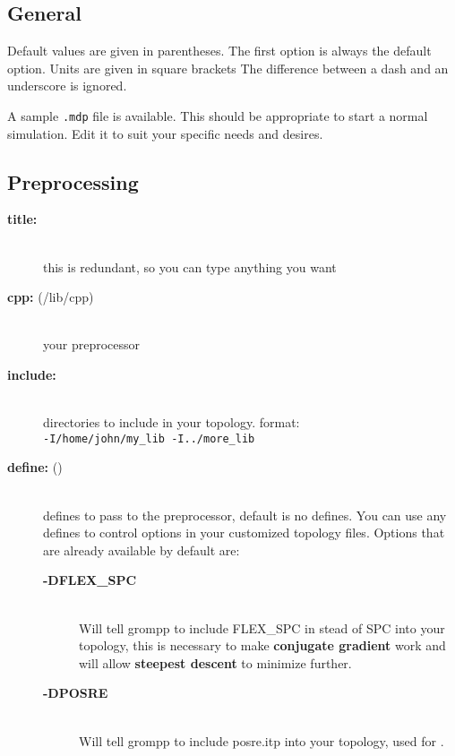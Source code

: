 \subsection{General}

Default values are given in parentheses. The first option is
always the default option. Units are given in square brackets The
difference between a dash and an underscore is ignored. 

A sample {\tt .mdp} file is
available. This should be appropriate to start a normal
simulation. Edit it to suit your specific needs and desires. 

\subsection{Preprocessing}
\begin{description}
\item[{\bf title:}]\mbox{}\\
this is redundant, so you can type anything you want
\item[{\bf cpp: }(/lib/cpp)]\mbox{}\\
your preprocessor
\item[{\bf include:}]\mbox{}\\
directories to include in your topology. format: 
\\{\tt-I/home/john/my\_lib -I../more\_lib}\\
\item[{\bf define: }()]\mbox{}\\
defines to pass to the preprocessor, default is no defines. You can use
any defines to control options in your customized topology files. Options
that are already available by default are:
\vspace{-2ex}\begin{description}
\item[{\bf -DFLEX\_SPC}]\mbox{}\\
Will tell grompp to include FLEX\_SPC in stead of SPC into your
topology, this is necessary to make 
{\bf conjugate gradient} work and will allow 
{\bf steepest descent} to minimize further.
\item[{\bf -DPOSRE}]\mbox{}\\
Will tell grompp to include posre.itp into your topology, used for
.
\end{description}
\end{description}

